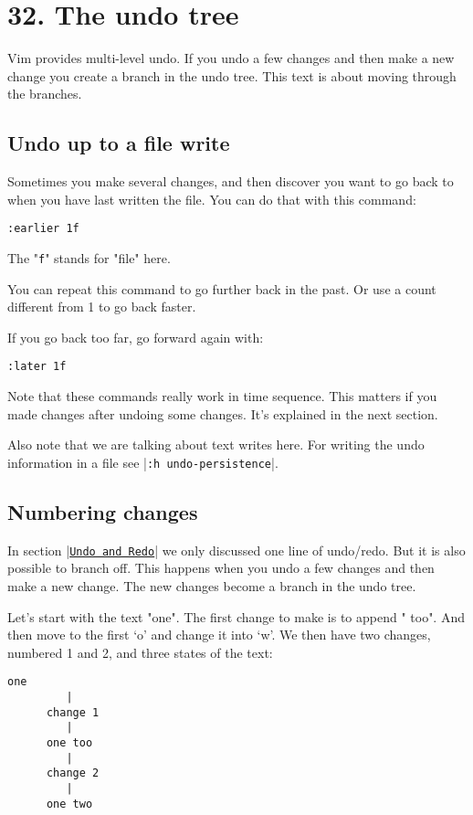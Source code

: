 \section{32. The undo tree}
Vim provides multi-level undo.
If you undo a few changes and then make a new change you create a branch in the undo tree.
This text is about moving through the branches.
\subsection{Undo up to a file write}
Sometimes you make several changes, and then discover you want to go back to when you have last written the file.
You can do that with this command:

\begin{Verbatim}[samepage=true]
 :earlier 1f
\end{Verbatim}

The "\texttt{f}" stands for "file" here.

You can repeat this command to go further back in the past.
Or use a count different from 1 to go back faster.

If you go back too far, go forward again with:

\begin{Verbatim}[samepage=true]
 :later 1f
\end{Verbatim}

Note that these commands really work in time sequence.
This matters if you made changes after undoing some changes.
It's explained in the next section.

Also note that we are talking about text writes here.
For writing the undo information in a file see |\texttt{:h undo-persistence}|.
\subsection{Numbering changes}
\label{Numbering changes}
In section |\hyperref[Undo and Redo]{\texttt{Undo and Redo}}| we only discussed one line of undo/redo.
But it is also possible to branch off.
This happens when you undo a few changes and then make a new change.
The new changes become a branch in the undo tree.

Let's start with the text "one".
The first change to make is to append " too".
And then move to the first `o' and change it into `w'.
We then have two changes, numbered 1 and 2, and three states of the text:

\begin{Verbatim}[samepage=true]
        one 
         |
      change 1
         |
      one too 
         |
      change 2
         |
      one two 
\end{Verbatim}


